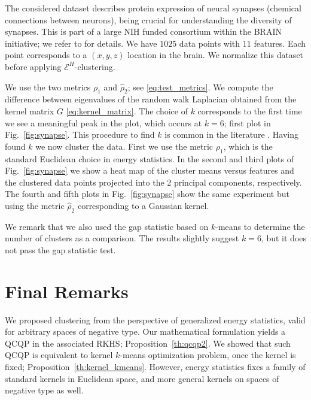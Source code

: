\documentclass{article}
\begin{document}
The considered dataset 
describes protein expression of neural synapses (chemical 
connections between neurons), being
crucial for understanding the diversity of synapses. This is
part of a large NIH funded consortium within the BRAIN initiative;
we refer to \citet{Collman2015} for details.
We have $1025$ data points
with $11$ features. Each point
corresponds to a $(x,y,z)$ location in the brain. We normalize this
dataset before applying $\mathcal{E}^H$-clustering.

We use the two
metrics $\rho_1$ and $\widehat{\rho}_2$; see \eqref{eq:test_metrics}.
We compute the difference between eigenvalues of the random walk Laplacian
obtained from the kernel matrix $G$ \eqref{eq:kernel_matrix}.
The choice of $k$ corresponds to the first time we see a meaningful
peak in the plot, which occurs at $k=6$; first plot in
Fig.~\ref{fig:synapse}.
This procedure to find $k$ is common in the literature \cite{vonLuxburg2007}.
Having found $k$ we now cluster the data.
First we use the metric $\rho_1$, which
is the standard Euclidean choice in energy statistics.
In the second and third plots of Fig.~\ref{fig:synapse} we show a heat
map of the cluster means versus features and the clustered data points
projected into the 2 principal components, respectively.
The fourth and fifth plots in Fig.~\ref{fig:synapse} show the same
experiment but using the metric $\widehat{\rho}_2$ corresponding
to a Gaussian kernel.

We remark that we also used the gap statistic \cite{Tibshirani2001} based
on $k$-means to determine the number of clusters as a comparison.
The results slightly suggest $k=6$, but it does not pass the gap
statistic test. 



\section{Final Remarks}
\label{sec:conclusion}

We proposed clustering from the perspective of generalized energy
statistics, valid for arbitrary spaces of negative type.
Our mathematical formulation yields
a QCQP in the associated RKHS;
Proposition~\ref{th:qcqp2}.
We showed that such QCQP
is equivalent to kernel $k$-means optimization problem, 
once the kernel is fixed; 
Proposition~\ref{th:kernel_kmeans}. However, energy statistics fixes
a family of standard kernels in Euclidean space, and
more general kernels 
on spaces of negative type as well.
\end{document}
